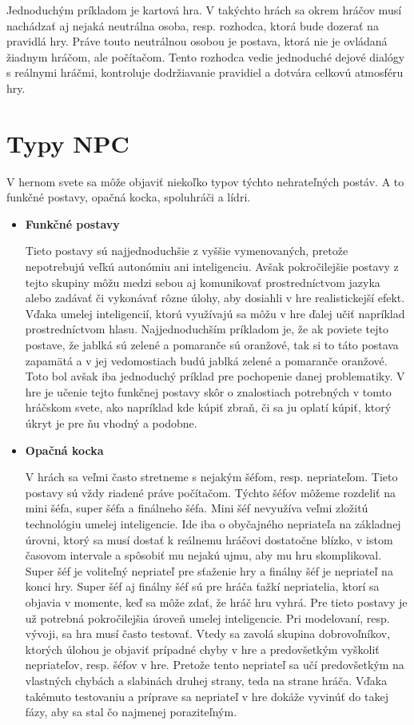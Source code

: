 \documentclass[10pt,twoside,slovak,a4paper]{article}
\begin{document}
\quad Jednoduchým príkladom je kartová hra. V takýchto hrách sa okrem hráčov musí nachádzať aj nejaká neutrálna osoba, resp. rozhodca, ktorá bude dozerať na pravidlá hry. Práve touto neutrálnou osobou je postava, ktorá nie je ovládaná žiadnym hráčom, ale počítačom. Tento rozhodca vedie jednoduché dejové dialógy s reálnymi hráčmi, kontroluje dodržiavanie pravidiel a dotvára celkovú atmosféru hry. ~\cite{NPC, AI} 
\begin{figure}[tbh]
\centering
\end{figure}
\section{Typy NPC} 
\quad V hernom svete sa môže objaviť niekoľko typov týchto nehrateľných postáv. A to funkčné postavy, opačná kocka, spoluhráči a lídri. 
\begin{itemize}
\item \textbf{Funkčné postavy}

\quad Tieto postavy sú najjednoduchšie z vyššie vymenovaných, pretože nepotrebujú veľkú autonómiu ani inteligenciu. Avšak pokročilejšie postavy z tejto skupiny môžu medzi sebou aj komunikovať prostredníctvom jazyka alebo zadávať či vykonávať rôzne úlohy, aby dosiahli v hre realistickejší efekt. Vďaka umelej inteligencií, ktorú využívajú sa môžu v hre ďalej učiť napríklad prostredníctvom hlasu. Najjednoduchším príkladom je, že ak poviete tejto postave, že jablká sú zelené a pomaranče sú oranžové, tak si to táto postava zapamätá a v jej vedomostiach budú jablká zelené a pomaranče oranžové. Toto bol avšak iba jednoduchý príklad pre pochopenie danej problematiky. V hre je učenie tejto funkčnej postavy skôr o znalostiach potrebných v tomto hráčskom svete, ako napríklad kde kúpiť zbraň, či sa ju oplatí kúpiť, ktorý úkryt je pre ňu vhodný a podobne.  \cite{Types}


\item \textbf{Opačná kocka}

\quad V hrách sa veľmi často stretneme s nejakým šéfom, resp. nepriateľom. Tieto postavy sú vždy riadené práve počítačom. Týchto šéfov môžeme rozdeliť na mini šéfa, super šéfa a finálneho šéfa. Mini šéf nevyužíva veľmi zložitú technológiu umelej inteligencie. Ide iba o obyčajného nepriateľa na základnej úrovni, ktorý sa musí dostať k reálnemu hráčovi dostatočne blízko, v istom časovom intervale a spôsobiť mu nejakú ujmu, aby mu hru skomplikoval. Super šéf je voliteľný nepriateľ pre sťaženie hry a finálny šéf je nepriateľ na konci hry. Super šéf aj finálny šéf sú pre hráča ťažkí nepriatelia, ktorí sa objavia v momente, keď sa môže zdať, že hráč hru vyhrá. Pre tieto postavy je už potrebná pokročilejšia úroveň umelej inteligencie. Pri modelovaní, resp. vývoji, sa hra musí často testovať. Vtedy sa zavolá skupina dobrovoľníkov, ktorých úlohou je objaviť prípadné chyby v hre a predovšetkým vyškoliť nepriateľov, resp. šéfov v hre. Pretože tento nepriateľ sa učí predovšetkým na vlastných chybách a slabinách druhej strany, teda na strane hráča. Vďaka takémuto testovaniu a príprave sa nepriateľ v hre dokáže vyvinúť do takej fázy, aby sa stal čo najmenej poraziteľným.  \cite{Types}


\end{itemize}
\end{document}
